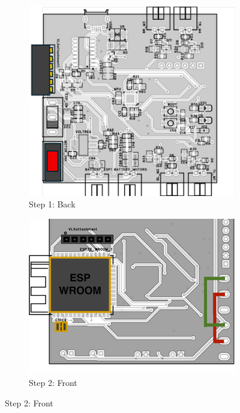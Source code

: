 \begin{figure}[H]
  \centering
  \begin{subfigure}[b]{0.48\linewidth}
    \centering
    \includegraphics[width=\linewidth]{img/manual/solder5.png}
    \caption{Step 1: Back}
  \end{subfigure}
  \hfill
  \begin{subfigure}[b]{0.48\linewidth}
    \centering
    \includegraphics[width=\linewidth]{img/manual/solder6.png}
    \caption{Step 2: Front}
  \end{subfigure}
\end{figure}


